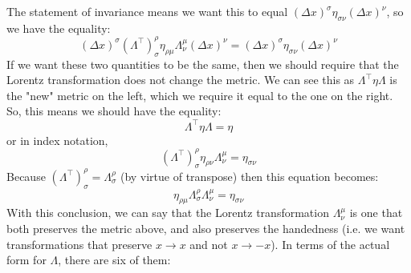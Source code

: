 The statement of invariance means we want this to equal \( (\Delta x)^{\sigma} \eta_{\sigma \nu}(\Delta x)^{\nu} \),
so we have the equality:
\[
	(\Delta x)^{\sigma}(\Lambda^{\top})^{\rho}_\sigma \eta_{\rho \mu} \Lambda^{\mu}_{\nu}(\Delta x)^{\nu} =
	(\Delta x)^{\sigma}\eta_{\sigma \nu} (\Delta x)^{\nu}
\]
If we want these two quantities to be the same, then we should require that the Lorentz transformation does
not change the metric. We can see this as \( \Lambda^{\top} \eta \Lambda \) is the "new" metric on the left,
which we require it equal to the one on the right. So, this means we should have the equality: 
\[
	\Lambda^{\top} \eta \Lambda = \eta 
\]
or in index notation,
\[
	(\Lambda^{\top})^{\rho}_{\sigma} \eta_{\rho \nu} \Lambda^{\mu}_\nu = \eta_{\sigma \nu}
\]
Because \( (\Lambda^{\top})^{\rho}_\sigma = \Lambda^{\rho}_\sigma \) (by virtue of transpose) 
then this equation becomes:
\[
	\eta_{\rho \mu}\Lambda^{\rho}_\sigma \Lambda^{\mu}_\nu = \eta_{\sigma \nu}
\]
With this conclusion, we can say that the Lorentz transformation \( \Lambda^{\mu}_\nu \) is one that both
preserves the metric above, and also preserves the handedness (i.e. we want transformations that preserve \(
x \to x \) and not \( x \to -x \)). In terms of the actual form for \( \Lambda \), there are six of them:
